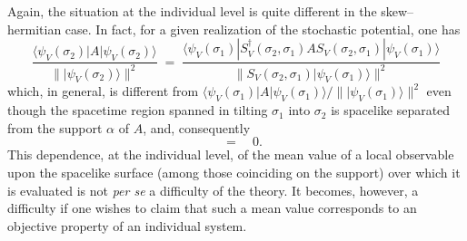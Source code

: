 \documentclass[12pt]{article}
\begin{document}
Again, the situation at the individual level is quite different in
the skew--hermitian case. In fact, for a given realization of the
stochastic potential, one has
\begin{equation}
\frac{\langle \psi_{V}(\sigma_{2})| A | \psi_{V}(\sigma_{2})
\rangle}{\| |\psi_{V}(\sigma_{2})\rangle \|^{2}} \; = \;
\frac{\langle \psi_{V}(\sigma_{1})| S_{V}^{\dagger}(\sigma_{2},
\sigma_{1}) A S_{V}(\sigma_{2}, \sigma_{1}) | \psi_{V}(\sigma_{1})
\rangle}{\| S_{V}(\sigma_{2}, \sigma_{1})
|\psi_{V}(\sigma_{1})\rangle \|^{2}}
\end{equation}
which, in general, is different from $\langle
\psi_{V}(\sigma_{1})| A | \psi_{V}(\sigma_{1}) \rangle/\|
|\psi_{V}(\sigma_{1})\rangle \|^{2}$ even though the spacetime
region spanned in tilting $\sigma_{1}$ into $\sigma_{2}$ is
spacelike separated from the support $\alpha$ of $A$, and,
consequently
\begin{equation}
[A, S_{V}(\sigma_{2}, \sigma_{1})] \quad = \quad 0.
\end{equation}
This dependence, at the individual level, of the mean value of a
local observable upon the spacelike surface (among those
coinciding on the support) over which it is evaluated is not {\it
per se} a difficulty of the theory. It becomes, however, a
difficulty if one wishes to claim that such a mean value
corresponds to an objective property of an individual system.
\end{document}
